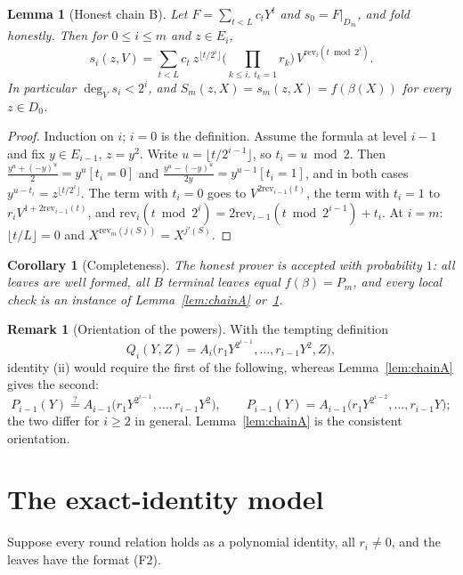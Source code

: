 \documentclass[11pt]{article}
\newtheorem{lemma}[theorem]{Lemma}
\newtheorem{corollary}[theorem]{Corollary}
\theoremstyle{definition}
\newtheorem{remark}[theorem]{Remark}
\newcommand{\rev}{\mathrm{rev}}
\begin{document}
\begin{lemma}[Honest chain B]\label{lem:chainB}
Let $F=\sum_{t<L}c_tY^t$ and $s_0=F|_{D_m}$, and fold honestly. Then for $0\le i\le m$ and $z\in E_i$,
\[
s_i(z,V)=\sum_{t<L}c_t\ z^{\lfloor t/2^i\rfloor}\Big(\prod_{k\le i,\ t_k=1}r_k\Big)\,V^{\rev_i(t\bmod2^i)} .
\]
In particular $\deg_Vs_i<2^i$, and $S_m(z,X)=s_m(z,X)=f(\beta(X))$ for every $z\in D_0$.
\end{lemma}
\begin{proof}
Induction on $i$; $i=0$ is the definition. Assume the formula at level $i-1$ and fix $y\in E_{i-1}$, $z=y^2$. Write $u=\lfloor t/2^{i-1}\rfloor$, so $t_i=u\bmod2$. Then $\frac{y^u+(-y)^u}{2}=y^u[t_i=0]$ and $\frac{y^u-(-y)^u}{2y}=y^{u-1}[t_i=1]$, and in both cases $y^{u-t_i}=z^{\lfloor t/2^i\rfloor}$. The term with $t_i=0$ goes to $V^{2\rev_{i-1}(t)}$, the term with $t_i=1$ to $r_iV^{1+2\rev_{i-1}(t)}$, and $\rev_i(t\bmod2^i)=2\rev_{i-1}(t\bmod2^{i-1})+t_i$. At $i=m$: $\lfloor t/L\rfloor=0$ and $X^{\rev_m(j(S))}=X^{j'(S)}$.
\end{proof}

\begin{corollary}[Completeness]
The honest prover is accepted with probability $1$: all leaves are well formed, all $B$ terminal leaves equal $f(\beta)=P_m$, and every local check is an instance of Lemma~\ref{lem:chainA} or~\ref{lem:chainB}.
\end{corollary}

\begin{remark}[Orientation of the powers]
With the tempting definition
\[
Q_i(Y,Z)=A_i\big(r_1Y^{2^{i-1}},\dots,r_{i-1}Y^2,Z\big),
\]
identity (ii) would require the first of the following, whereas Lemma~\ref{lem:chainA} gives the second:
\[
P_{i-1}(Y)\overset?=A_{i-1}\big(r_1Y^{2^{i-1}},\dots,r_{i-1}Y^2\big),\qquad P_{i-1}(Y)=A_{i-1}\big(r_1Y^{2^{i-2}},\dots,r_{i-1}Y\big);
\]
the two differ for $i\ge2$ in general. Lemma~\ref{lem:chainA} is the consistent orientation.
\end{remark}

\section{The exact-identity model}

Suppose every round relation holds as a polynomial identity, all $r_i\neq0$, and the leaves have the format (F2).
\end{document}
